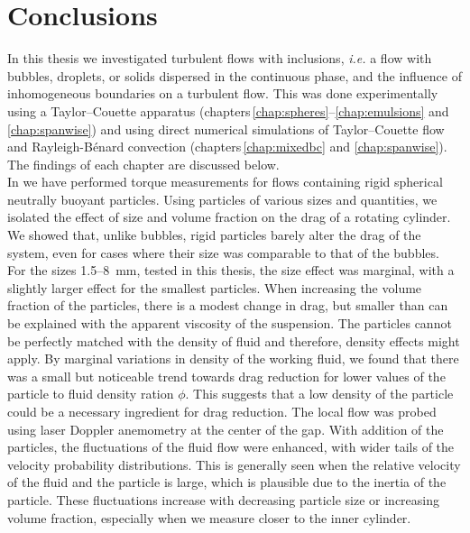 \chapter*{Conclusions}\label{chap:Conclusions}
\graphicspath{{fig/}}
In this thesis we investigated turbulent flows with inclusions, \textit{i.e.}
a flow with bubbles, droplets, or solids dispersed in the continuous phase,
and the influence of inhomogeneous boundaries on a turbulent flow.
This was done experimentally using a Taylor--Couette apparatus
(chapters\,\ref{chap:spheres}--\ref{chap:emulsions} and \ref{chap:spanwise})
and using direct numerical simulations of Taylor--Couette flow and
Rayleigh-B\'enard convection (chapters\,\ref{chap:mixedbc} and
\ref{chap:spanwise}).
The findings of each chapter are discussed below.\\
\indent In  we have performed torque measurements for
flows containing rigid spherical neutrally buoyant particles.
Using particles of various sizes and quantities, we isolated the effect of
size and volume fraction on the drag of a rotating cylinder.
We showed that, unlike bubbles, rigid particles barely alter the drag of the
system, even for cases where their size was comparable to that of the bubbles.
For the sizes 1.5--\SI{8}{\milli\metre}, tested in this thesis, the size
effect was marginal, with a slightly larger effect for the smallest particles.
When increasing the volume fraction of the particles, there is a modest change
in drag, but smaller than can be explained with the apparent viscosity of the
suspension.
The particles cannot be perfectly matched with the density of fluid and
therefore, density effects might apply.
By marginal variations in density of the working fluid, we found that there
was a small but noticeable trend towards drag reduction for lower values of
the particle to fluid density ration $\phi$.
This suggests that a low density of the particle could be a necessary
ingredient for drag reduction. 
The local flow was probed using laser Doppler anemometry at the center of the
gap.
With addition of the particles, the fluctuations of the fluid flow were enhanced,
with wider tails of the velocity probability distributions.
This is generally seen when the relative velocity of the fluid and the
particle is large, which is plausible due to the inertia of the particle.
These fluctuations increase with decreasing particle size or increasing volume
fraction, especially when we measure closer to the inner cylinder.\\
